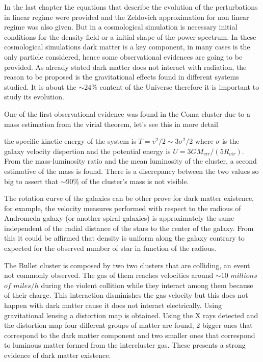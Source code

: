 In the last chapter the equations that describe the evolution of 
the perturbations in linear regime were provided and the Zeldovich 
approximation for non linear regime was also given. But in a cosmological
simulation is necessary initial conditions for the density field
or a initial shape of the power spectrum. In these cosmological simulations 
dark matter is a key component, in many cases is the only particle considered,
hence some observational evidences are going to be provided. As already stated
dark matter does not interact with radiation, the reason to be proposed 
is the gravitational effects found in different systems studied. It is 
about the  $\sim 24\%$ content of the Universe therefore it is important 
to study its evolution. 

One of the first observational evidence was found in the Coma cluster due to
a mass estimation from the virial theorem, let's see this in more detail  

the specific kinetic energy of the system is $T = v^2/2 \sim 3\sigma^2/2 $ 
where $\sigma$ is the galaxy velocity dispertion and the potential energy
is $U = 3GM_{vir}/(5R_{vir})$. From the mass-luminosity ratio and the 
mean luminosity of the cluster, a second estimative of the mass is found. There is
a discrepancy between the two values so big to assert that $\sim 90\%$ of the 
cluster's mass is not visible. 

The rotation curve of the galaxies can be other prove for dark matter existence,
for example, the velocity measures performed with respect to the radious of Andromeda 
galaxy (or another spiral galaxies) is approximately the same independent of the radial
distance of the stars to the center of the galaxy. From this it could be affirmed that
density is uniform along the galaxy contrary to expected for the observed 
number of star in function of the radious. 


The Bullet cluster is composed by two two clusters that are colliding, an event 
not commonly observed. The gas of them reaches velocities around $\sim 10$ $millions$ $of$ $miles/h$
during the violent collition while they interact among them because of their charge. 
This interaction disminishes the gas velocity but this does not happen with dark
matter cause it does not interact electrically. 
Using gravitational lensing a distortion map is obtained. Using the X rays detected
and the distortion map four different groups of matter are found, 2 bigger ones
that correspond to the dark matter component and two smaller ones that correspond
to luminous matter formed from the intercluster gas. These presents a strong
evidence of dark matter existence. 

